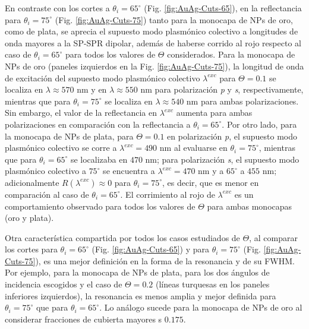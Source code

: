En contraste con los cortes a $\theta_i=65^\circ$ (Fig. \ref{fig:AuAg-Cuts-65}), en la reflectancia para $\theta_i=75^\circ$ (Fig. \ref{fig:AuAg-Cuts-75}) tanto para la monocapa de NPs de oro, como de plata, se aprecia el supuesto modo plasmónico colectivo a longitudes de onda mayores a la SP-SPR dipolar, además de haberse corrido al rojo respecto al caso de $\theta_i=65^\circ$ para todos los valores de $\Theta$ considerados. Para la monocapa de NPs de oro (paneles izquierdos en la Fig. \ref{fig:AuAg-Cuts-75}), la longitud de onda de excitación del supuesto modo plasmónico colectivo $\lambda^{exc}$ para $\Theta=0.1$ se localiza en $\lambda\approx570$ nm y en $\lambda\approx550$ nm para polarización \emph{p} y \emph{s}, respectivamente, mientras que para $\theta_i=75^\circ$ se localiza en $\lambda\approx 540$ nm para ambas polarizaciones. Sin embargo, el valor de la reflectancia en $\lambda^{exc}$ aumenta para ambas polarizaciones en comparación con la reflectancia a $\theta_i=65^\circ$. Por otro lado, para la monocapa de NPs de plata, para $\Theta=0.1$ en polarización \emph{p}, el supuesto modo plasmónico colectivo se corre a $\lambda^{exc}=490$ nm al evaluarse en $\theta_i=75^\circ$, mientras que para $\theta_i=65^\circ$ se localizaba en $470$ nm; para polarización \emph{s}, el supuesto modo plasmónico colectivo a $75^\circ$ se encuentra a $\lambda^{exc}=470$ nm y a $65^\circ$ a $455$ nm; adicionalmente $R(\lambda^{exc})\approx 0$ para $\theta_i=75^\circ$, es decir, que es menor en comparación al caso de $\theta_i=65^\circ$. El corrimiento al rojo de $\lambda^{exc}$ es un comportamiento observado para todos los valores de $\Theta$ para ambas monocapas (oro y plata).

Otra característica compartida por todos los casos estudiados de $\Theta$, al comparar los cortes para $\theta_i=65^\circ$ (Fig. \ref{fig:AuAg-Cuts-65}) y para $\theta_i=75^\circ$ (Fig. \ref{fig:AuAg-Cuts-75}), es una mejor definición en la forma de la resonancia y de su FWHM. Por ejemplo, para la monocapa de NPs de plata, para los dos ángulos de incidencia escogidos y el caso de $\Theta=0.2$ (líneas turquesas en los paneles inferiores izquierdos), la resonancia es menos amplia y mejor definida para $\theta_i=75^\circ$ que para $\theta_i=65^\circ$. Lo análogo sucede para la monocapa de NPs de oro al considerar fracciones de cubierta mayores s $0.175$.%

